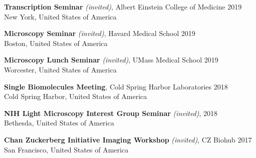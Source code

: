 \documentclass[margin,line]{res}
\begin{document}
\begin{resume}
\vspace*{-2.5mm}
{\bf  Transcription Seminar} {\it (invited)}, Albert Einstein College of Medicine \hfill 2019\\
 New York, United States of America%

\vspace*{-2.5mm}
{\bf  Microscopy Seminar} {\it (invited)}, Havard Medical School \hfill 2019\\
 Boston, United States of America%

\vspace*{-2.5mm}
{\bf Microscopy Lunch Seminar} {\it (invited)}, UMass Medical School \hfill 2019\\
 Worcester, United States of America%

\vspace*{-2.5mm}
{\bf Single Biomolecules Meeting}, Cold Spring Harbor Laboratories  \hfill 2018\\
Cold Spring Harbor, United States of America %

\vspace*{-2.5mm}
{\bf NIH Light Microscopy Interest Group Seminar} {\it (invited)},   \hfill 2018\\
 Bethesda, United States of America %

\vspace*{-2.5mm}
{\bf Chan Zuckerberg Initiative Imaging Workshop} {\it (invited)}, CZ Biohub \hfill 2017\\
 San Francisco, United States of America%


\end{resume}
\end{document}
